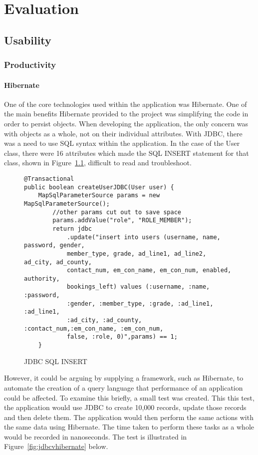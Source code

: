 \chapter{Evaluation}
\label{evaluation}

\section{Usability}

\subsection{Productivity}

\subsubsection{Hibernate}

One of the core technologies used within the application was Hibernate. One of the main benefits Hibernate provided to the project was simplifying the code in order to persist objects. When developing the application, the only concern was with objects as a whole, not on their individual attributes. With JDBC, there was a need to use SQL syntax within the application. In the case of the User class, there were 16 attributes which made the SQL INSERT statement for that class, shown in Figure~\ref{fig:jdbcsql}, difficult to read and troubleshoot.

\begin{figure}[H]
\begin{lstlisting}
@Transactional
public boolean createUserJDBC(User user) {
	MapSqlParameterSource params = new MapSqlParameterSource();
		//other params cut out to save space
		params.addValue("role", "ROLE_MEMBER");
		return jdbc
			.update("insert into users (username, name, password, gender, 
			member_type, grade, ad_line1, ad_line2, ad_city, ad_county,
			contact_num, em_con_name, em_con_num, enabled, authority,
			bookings_left) values (:username, :name, :password, 
			:gender, :member_type, :grade, :ad_line1, :ad_line1, 
			:ad_city, :ad_county, :contact_num,:em_con_name, :em_con_num,
			false, :role, 0)",params) == 1;
	}
\end{lstlisting}
\caption{JDBC SQL INSERT}
\label{fig:jdbcsql}
\end{figure}

However, it could be arguing by supplying a framework, such as Hibernate, to automate the creation of a query language that performance of an application could be affected. To examine this briefly, a small test was created. This this test, the application would use JDBC to create 10,000 records, update those records and then delete them. The application would then perform the same actions with the same data using Hibernate. The time taken to perform these tasks as a whole would be recorded in nanoseconds. The test is illustrated in Figure~\ref{fig:jdbcvhibernate} below.

